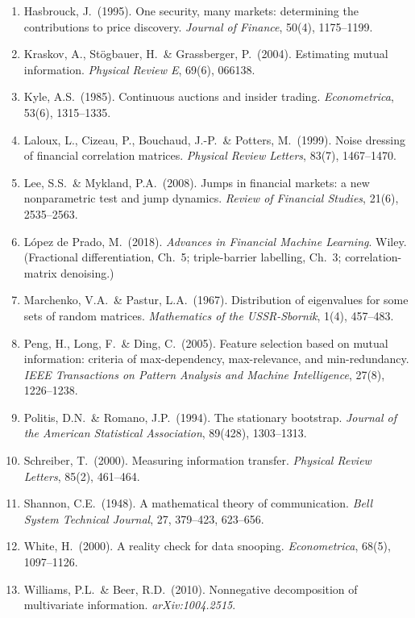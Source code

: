 \documentclass[11pt,a4paper]{article}
\theoremstyle{definition}
\theoremstyle{plain}
\begin{document}
\begin{enumerate}
  \item Hasbrouck, J.\ (1995). One security, many markets: determining the contributions to price
        discovery. \textit{Journal of Finance}, 50(4), 1175--1199.

  \item Kraskov, A., St\"ogbauer, H.\ \& Grassberger, P.\ (2004). Estimating mutual information.
        \textit{Physical Review E}, 69(6), 066138.

  \item Kyle, A.S.\ (1985). Continuous auctions and insider trading. \textit{Econometrica}, 53(6),
        1315--1335.

  \item Laloux, L., Cizeau, P., Bouchaud, J.-P.\ \& Potters, M.\ (1999). Noise dressing of financial
        correlation matrices. \textit{Physical Review Letters}, 83(7), 1467--1470.

  \item Lee, S.S.\ \& Mykland, P.A.\ (2008). Jumps in financial markets: a new nonparametric test and
        jump dynamics. \textit{Review of Financial Studies}, 21(6), 2535--2563.

  \item L\'opez de Prado, M.\ (2018). \textit{Advances in Financial Machine Learning}. Wiley.
        (Fractional differentiation, Ch.\ 5; triple-barrier labelling, Ch.\ 3; correlation-matrix
        denoising.)

  \item Marchenko, V.A.\ \& Pastur, L.A.\ (1967). Distribution of eigenvalues for some sets of random
        matrices. \textit{Mathematics of the USSR-Sbornik}, 1(4), 457--483.

  \item Peng, H., Long, F.\ \& Ding, C.\ (2005). Feature selection based on mutual information:
        criteria of max-dependency, max-relevance, and min-redundancy. \textit{IEEE Transactions on
        Pattern Analysis and Machine Intelligence}, 27(8), 1226--1238.

  \item Politis, D.N.\ \& Romano, J.P.\ (1994). The stationary bootstrap. \textit{Journal of the
        American Statistical Association}, 89(428), 1303--1313.

  \item Schreiber, T.\ (2000). Measuring information transfer. \textit{Physical Review Letters},
        85(2), 461--464.

  \item Shannon, C.E.\ (1948). A mathematical theory of communication. \textit{Bell System Technical
        Journal}, 27, 379--423, 623--656.

  \item White, H.\ (2000). A reality check for data snooping. \textit{Econometrica}, 68(5),
        1097--1126.

  \item Williams, P.L.\ \& Beer, R.D.\ (2010). Nonnegative decomposition of multivariate information.
        \textit{arXiv:1004.2515}.

\end{enumerate}
\end{document}
